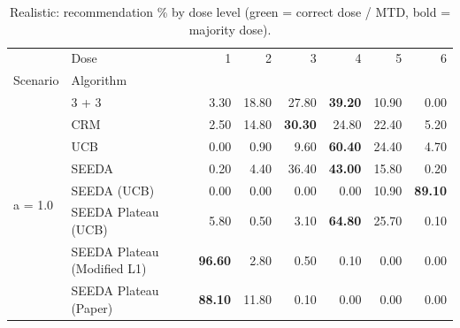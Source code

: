 \begin{table}[H]
\centering
\caption{Realistic: recommendation \% by dose level (green = correct dose / MTD, bold = majority dose).}
\label{tab:real_rec_by_dose}
\begin{tabular}{llrrrrrr}
\toprule
 & Dose & 1 & 2 & 3 & 4 & 5 & 6 \\
Scenario & Algorithm &  &  &  &  &  &  \\
\midrule
\multirow[c]{8}{*}{a = 1.0} & 3 + 3 & 3.30 & 18.80 & {\cellcolor[HTML]{C8E6C9}} 27.80 & \bfseries 39.20 & 10.90 & 0.00 \\
 & CRM & 2.50 & 14.80 & {\cellcolor[HTML]{C8E6C9}} \bfseries 30.30 & 24.80 & 22.40 & 5.20 \\
 & UCB & 0.00 & 0.90 & {\cellcolor[HTML]{C8E6C9}} 9.60 & \bfseries 60.40 & 24.40 & 4.70 \\
 & SEEDA & 0.20 & 4.40 & {\cellcolor[HTML]{C8E6C9}} 36.40 & \bfseries 43.00 & 15.80 & 0.20 \\
 & SEEDA (UCB) & 0.00 & 0.00 & {\cellcolor[HTML]{C8E6C9}} 0.00 & 0.00 & 10.90 & \bfseries 89.10 \\
 & SEEDA Plateau (UCB) & 5.80 & 0.50 & {\cellcolor[HTML]{C8E6C9}} 3.10 & \bfseries 64.80 & 25.70 & 0.10 \\
 & SEEDA Plateau (Modified L1) & \bfseries 96.60 & 2.80 & {\cellcolor[HTML]{C8E6C9}} 0.50 & 0.10 & 0.00 & 0.00 \\
 & SEEDA Plateau (Paper) & \bfseries 88.10 & 11.80 & {\cellcolor[HTML]{C8E6C9}} 0.10 & 0.00 & 0.00 & 0.00 \\
\bottomrule
\end{tabular}
\end{table}
